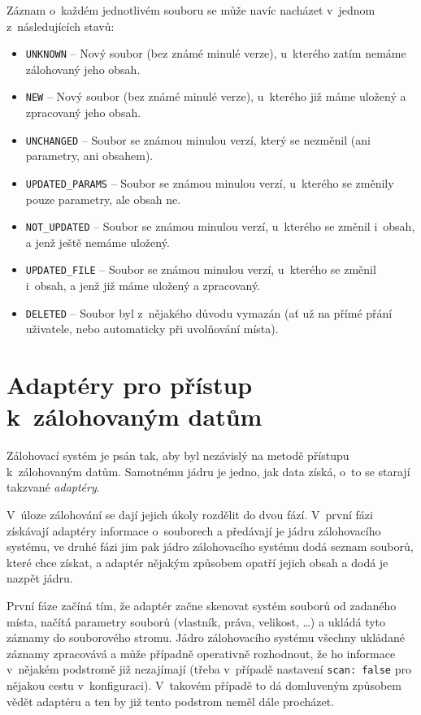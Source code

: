 Záznam o~každém jednotlivém souboru se může navíc nacházet v~jednom
z~následujících stavů:
\begin{itemize}
	\item\texttt{UNKNOWN} -- Nový soubor (bez známé minulé verze), u~kterého
	zatím nemáme zálohovaný jeho obsah.
	\item\texttt{NEW} -- Nový soubor (bez známé minulé verze), u~kterého již
	máme uložený a zpracovaný jeho obsah.
	\item\texttt{UNCHANGED} -- Soubor se známou minulou verzí, který se
	nezměnil (ani parametry, ani obsahem).
	\item\texttt{UPDATED\_PARAMS} -- Soubor se známou minulou verzí, u~kterého
	se změnily pouze parametry, ale obsah ne.
	\item\texttt{NOT\_UPDATED} -- Soubor se známou minulou verzí, u~kterého
	se změnil i~obsah, a jenž ještě nemáme uložený.
	\item\texttt{UPDATED\_FILE} -- Soubor se známou minulou verzí, u~kterého
	se změnil i~obsah, a jenž již máme uložený a zpracovaný.
	\item\texttt{DELETED} -- Soubor byl z~nějakého důvodu vymazán (ať už na
	přímé přání uživatele, nebo automaticky při uvolňování místa).
\end{itemize}

\section{Adaptéry pro přístup k~zálohovaným datům}

Zálohovací systém je psán tak, aby byl nezávislý na metodě přístupu k~zálohovaným
datům. Samotnému jádru je jedno, jak data získá, o~to se starají takzvané
{\it adaptéry}.

V~úloze zálohování se dají jejich úkoly rozdělit do dvou fází. V~první fázi
získávají adaptéry informace o~souborech a předávají je jádru zálohovacího
systému, ve druhé fázi jim pak jádro zálohovacího systému dodá seznam souborů,
které chce získat, a adaptér nějakým způsobem opatří jejich obsah a dodá je
nazpět jádru.

První fáze začíná tím, že adaptér začne skenovat systém souborů od zadaného
místa, načítá parametry souborů (vlastník, práva, velikost, \dots) a ukládá tyto
záznamy do souborového stromu. Jádro zálohovacího systému všechny ukládané
záznamy zpracovává a může případně operativně rozhodnout, že ho informace v~nějakém
podstromě již nezajímají (třeba v~případě nastavení \texttt{scan: false} pro
nějakou cestu v~konfiguraci). V~takovém případě to dá domluveným způsobem vědět
adaptéru a ten by již tento podstrom neměl dále procházet.

